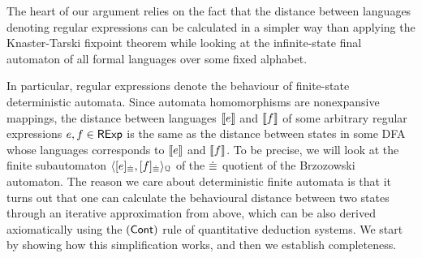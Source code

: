 The heart of our argument relies on the fact that the distance between languages denoting regular expressions can be calculated in a simpler way than applying the Knaster-Tarski fixpoint theorem while looking at the infinite-state final automaton of all formal languages over some fixed alphabet. 

In particular, regular expressions denote the behaviour of finite-state deterministic automata. Since automata homomorphisms are nonexpansive mappings, the distance between languages $\left\llbracket{e}\right\rrbracket$ and $\left\llbracket{f}\right\rrbracket$ of some arbitrary regular expressions $e, f \in \mathsf{RExp}$ is the same as the distance between states in some DFA whose languages corresponds to $\left\llbracket{e}\right\rrbracket$ and $\left\llbracket{f}\right\rrbracket$. To be precise, we will look at the finite subautomaton $\langle [e]_{{\mathrel{\dot\equiv}}}, [f]_{{\mathrel{\dot\equiv}}} \rangle_{\mathcal{Q}}$ of the ${\mathrel{\dot\equiv}}$ quotient of the Brzozowski automaton. The reason we care about deterministic finite automata is that it turns out that one can calculate the behavioural distance between two states through an iterative approximation from above, which can be also derived axiomatically using the $(\textsf{Cont})$ rule of quantitative deduction systems. We start by showing how this simplification works, and then we establish completeness.

